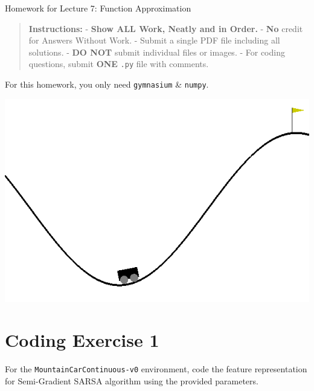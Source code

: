 \documentclass[
  letterpaper,
  DIV=11,
  numbers=noendperiod]{scrreprt}
\begin{document}
\begin{tcolorbox}[enhanced jigsaw, arc=.35mm, toprule=.15mm, leftrule=.75mm, colback=white, left=2mm, colframe=quarto-callout-note-color-frame, rightrule=.15mm, opacityback=0, breakable, bottomrule=.15mm]

Homework for Lecture 7: Function Approximation 📝

\end{tcolorbox}

\begin{quote}
\textbf{Instructions:} - \textbf{Show ALL Work, Neatly and in Order.} -
\textbf{No} credit for Answers Without Work. - Submit a single PDF file
including all solutions. - \textbf{DO NOT} submit individual files or
images. - For coding questions, submit \textbf{ONE} \texttt{.py} file
with comments.
\end{quote}

\begin{tcolorbox}[enhanced jigsaw, toprule=.15mm, leftrule=.75mm, coltitle=black, left=2mm, opacityback=0, titlerule=0mm, arc=.35mm, toptitle=1mm, opacitybacktitle=0.6, bottomtitle=1mm, colframe=quarto-callout-note-color-frame, title=\textcolor{quarto-callout-note-color}{\faInfo}\hspace{0.5em}{Note}, rightrule=.15mm, bottomrule=.15mm, colbacktitle=quarto-callout-note-color!10!white, breakable, colback=white]

For this homework, you only need \texttt{gymnasium} \& \texttt{numpy}.

\end{tcolorbox}

\begin{center}
\includegraphics[width=0.4\linewidth,height=\textheight,keepaspectratio]{homework/images/mountaincar.gif}
\end{center}

\section{Coding Exercise 1}\label{coding-exercise-1-4}

For the \texttt{MountainCarContinuous-v0} environment, code the feature
representation for Semi-Gradient SARSA algorithm using the provided
parameters.
\end{document}
